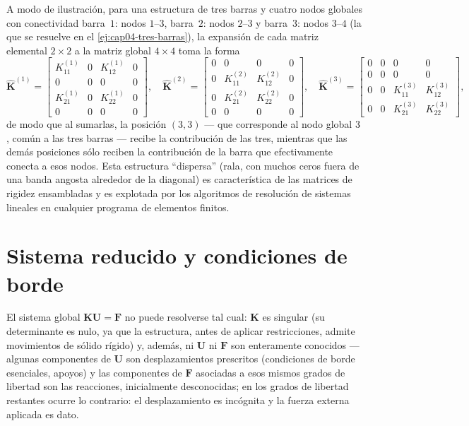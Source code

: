 A modo de ilustración, para una estructura de tres barras y cuatro nodos globales con conectividad barra~$1$: nodos $1$--$3$, barra~$2$: nodos $2$--$3$ y barra~$3$: nodos $3$--$4$ (la que se resuelve en el \cref{ej:cap04-tres-barras}), la expansión de cada matriz elemental $2\times2$ a la matriz global $4\times4$ toma la forma
\[
\widehat{\mathbf{K}}^{(1)} =
\begin{bmatrix}
K^{(1)}_{11} & 0 & K^{(1)}_{12} & 0 \\
0 & 0 & 0 & 0 \\
K^{(1)}_{21} & 0 & K^{(1)}_{22} & 0 \\
0 & 0 & 0 & 0
\end{bmatrix}, \quad
\widehat{\mathbf{K}}^{(2)} =
\begin{bmatrix}
0 & 0 & 0 & 0 \\
0 & K^{(2)}_{11} & K^{(2)}_{12} & 0 \\
0 & K^{(2)}_{21} & K^{(2)}_{22} & 0 \\
0 & 0 & 0 & 0
\end{bmatrix}, \quad
\widehat{\mathbf{K}}^{(3)} =
\begin{bmatrix}
0 & 0 & 0 & 0 \\
0 & 0 & 0 & 0 \\
0 & 0 & K^{(3)}_{11} & K^{(3)}_{12} \\
0 & 0 & K^{(3)}_{21} & K^{(3)}_{22}
\end{bmatrix},
\]
de modo que al sumarlas, la posición $(3,3)$ --- que corresponde al nodo global $3$, común a las tres barras --- recibe la contribución de las tres, mientras que las demás posiciones sólo reciben la contribución de la barra que efectivamente conecta a esos nodos. Esta estructura ``dispersa'' (rala, con muchos ceros fuera de una banda angosta alrededor de la diagonal) es característica de las matrices de rigidez ensambladas y es explotada por los algoritmos de resolución de sistemas lineales en cualquier programa de elementos finitos.

\section{Sistema reducido y condiciones de borde}
\label{sec:cap04-sistema-reducido}

El sistema global $\mathbf{K}\mathbf{U}=\mathbf{F}$ no puede resolverse tal cual: $\mathbf{K}$ es singular (su determinante es nulo, ya que la estructura, antes de aplicar restricciones, admite movimientos de sólido rígido) y, además, ni $\mathbf{U}$ ni $\mathbf{F}$ son enteramente conocidos --- algunas componentes de $\mathbf{U}$ son desplazamientos prescritos (condiciones de borde esenciales, apoyos) y las componentes de $\mathbf{F}$ asociadas a esos mismos grados de libertad son las reacciones, inicialmente desconocidas; en los grados de libertad restantes ocurre lo contrario: el desplazamiento es incógnita y la fuerza externa aplicada es dato.

